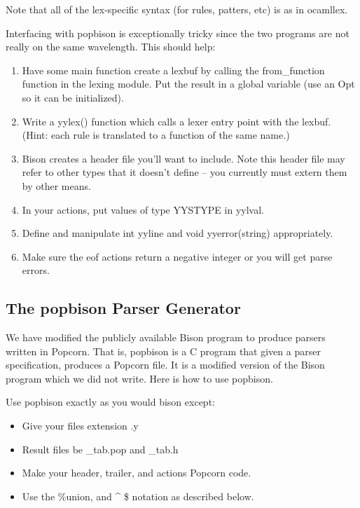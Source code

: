 \documentclass[titlepage,10pt]{article}
\begin{document}
Note that all of the lex-specific syntax (for rules, patters, etc) is as
in ocamllex.

Interfacing with popbison is exceptionally tricky since the two programs
are not really on the same wavelength.  This should help: 

\begin{enumerate}

\item Have some main function create a lexbuf by calling the
from{\_}function function in the lexing module.  Put the result in a
global variable (use an Opt so it can be initialized).

\item Write a yylex() function which calls a lexer entry point with the
lexbuf.  (Hint: each rule is translated to a function of the same
name.)

\item Bison creates a header file you'll want to include.  Note this
header file may refer to other types that it doesn't define -- you
currently must extern them by other means.

\item In your actions, put values of type YYSTYPE in yylval.

\item Define and manipulate int yyline and void yyerror(string)
appropriately.

\item Make sure the eof actions return a negative integer or you will
get parse errors.

\end{enumerate}


\subsection{The popbison Parser Generator\label{bison}}

We have modified the publicly available Bison program to produce parsers
written in Popcorn.  That is, popbison is a C program that given a
parser specification, produces a Popcorn file.  It is a modified version
of the Bison program which we did not write.  Here is how to use
popbison.

Use popbison exactly as you would bison except: 

\begin{itemize}

\item Give your files extension .y

\item Result files be {\_}tab.pop and {\_}tab.h

\item Make your header, trailer, and actions Popcorn code.

\item Use the \%union, and \^{} \$ notation as described below.

\end{itemize}
\end{document}
